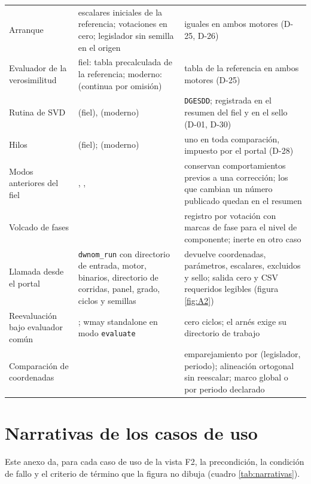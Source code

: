 \begin{longtable}{L{2.6cm}L{5.0cm}L{4.8cm}}
\addlinespace
Arranque & escalares iniciales de la referencia; votaciones en cero; legislador sin semilla
en el origen & iguales en ambos motores (D-25, D-26) \\
\addlinespace
Evaluador de la verosimilitud & fiel: tabla precalculada de la referencia; moderno:
 (continua por omisión) & tabla de la referencia en ambos motores (D-25)
\\
\addlinespace
Rutina de SVD &  (fiel), 
(moderno) & \texttt{DGESDD}; registrada en el resumen del fiel y en el sello (D-01, D-30) \\
\addlinespace
Hilos &  (fiel);  (moderno) & uno en toda
comparación, impuesto por el portal (D-28) \\
\addlinespace
Modos anteriores del fiel & ,
,  & conservan
comportamientos previos a una corrección; los que cambian un número publicado quedan en el
resumen \\
\addlinespace
Volcado de fases &  & registro por votación con marcas de fase para
el nivel de componente; inerte en otro caso \\
\addlinespace
Llamada desde el portal & \texttt{dwnom\_run} con directorio de entrada, motor, binarios,
directorio de corridas, panel, grado, ciclos y semillas & devuelve coordenadas, parámetros,
escalares, excluidos y sello; salida cero y CSV requeridos legibles (figura
\ref{fig:A2}) \\
\addlinespace
Reevaluación bajo evaluador común & ; wmay standalone en modo
\texttt{evaluate} & cero ciclos; el arnés exige su directorio de trabajo \\
\addlinespace
Comparación de coordenadas &  & emparejamiento por (legislador,
periodo); alineación ortogonal sin reescalar; marco global o por periodo declarado \\
\end{longtable}
\normalsize

\chapter{Narrativas de los casos de uso}
\label{anexo:narrativas}

Este anexo da, para cada caso de uso de la vista F2, la precondición, la condición de fallo y
el criterio de término que la figura no dibuja (cuadro \ref{tab:narrativas}).

